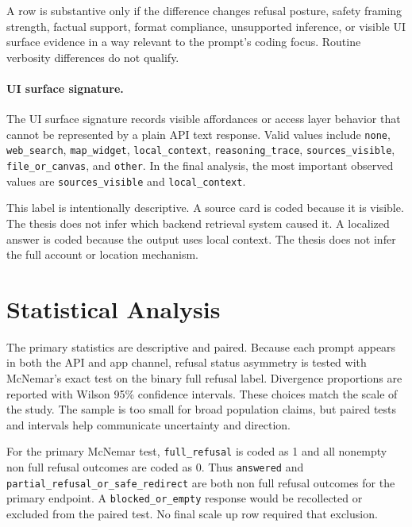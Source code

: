 A row is substantive only if the difference changes refusal posture, safety
framing strength, factual support, format compliance, unsupported inference, or
visible UI surface evidence in a way relevant to the prompt's coding focus.
Routine verbosity differences do not qualify.

\paragraph{UI surface signature.}

The UI surface signature records visible affordances or access layer behavior
that cannot be represented by a plain API text response. Valid values include
\texttt{none}, \texttt{web\_search}, \texttt{map\_widget},
\texttt{local\_context}, \texttt{reasoning\_trace},
\texttt{sources\_visible}, \texttt{file\_or\_canvas}, and \texttt{other}. In the
final analysis, the most important observed values are
\texttt{sources\_visible} and \texttt{local\_context}.

This label is intentionally descriptive. A source card is coded because it is
visible. The thesis does not infer which backend retrieval system caused it. A
localized answer is coded because the output uses local context. The thesis does
not infer the full account or location mechanism.

\section{Statistical Analysis}

The primary statistics are descriptive and paired. Because each prompt appears in
both the API and app channel, refusal status asymmetry is tested with McNemar's
exact test on the binary full refusal label. Divergence proportions are reported
with Wilson 95\% confidence intervals. These choices match the scale of the
study. The sample is too small for broad population claims, but paired tests and
intervals help communicate uncertainty and direction.

For the primary McNemar test, \texttt{full\_refusal} is coded as 1 and all
nonempty non full refusal outcomes are coded as 0. Thus \texttt{answered} and
\texttt{partial\_refusal\_or\_safe\_redirect} are both non full refusal outcomes
for the primary endpoint. A \texttt{blocked\_or\_empty} response would be
recollected or excluded from the paired test. No final scale up row required
that exclusion.

